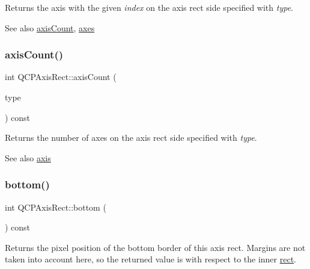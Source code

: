 Returns the axis with the given {\itshape index} on the axis rect side specified with {\itshape type}.

\begin{DoxySeeAlso}{See also}
\hyperlink{class_q_c_p_axis_rect_a85b321acec0f694d8b5fdeafdbff3133}{axis\+Count}, \hyperlink{class_q_c_p_axis_rect_a8db4722cb93e9c4a6f0d91150c200867}{axes} 
\end{DoxySeeAlso}
\hypertarget{class_q_c_p_axis_rect_a85b321acec0f694d8b5fdeafdbff3133}{}\label{class_q_c_p_axis_rect_a85b321acec0f694d8b5fdeafdbff3133} 
\subsubsection{\texorpdfstring{axis\+Count()}{axisCount()}}
{\footnotesize\ttfamily int Q\+C\+P\+Axis\+Rect\+::axis\+Count (\begin{DoxyParamCaption}\item[{\hyperlink{class_q_c_p_axis_ae2bcc1728b382f10f064612b368bc18a}{Q\+C\+P\+Axis\+::\+Axis\+Type}}]{type }\end{DoxyParamCaption}) const}

Returns the number of axes on the axis rect side specified with {\itshape type}.

\begin{DoxySeeAlso}{See also}
\hyperlink{class_q_c_p_axis_rect_a583ae4f6d78b601b732183f6cabecbe1}{axis} 
\end{DoxySeeAlso}
\hypertarget{class_q_c_p_axis_rect_acefdf1abaa8a8ab681e906cc2be9581e}{}\label{class_q_c_p_axis_rect_acefdf1abaa8a8ab681e906cc2be9581e} 
\subsubsection{\texorpdfstring{bottom()}{bottom()}}
{\footnotesize\ttfamily int Q\+C\+P\+Axis\+Rect\+::bottom (\begin{DoxyParamCaption}{ }\end{DoxyParamCaption}) const\hspace{0.3cm}{\ttfamily [inline]}}

Returns the pixel position of the bottom border of this axis rect. Margins are not taken into account here, so the returned value is with respect to the inner \hyperlink{class_q_c_p_layout_element_a208effccfe2cca4a0eaf9393e60f2dd4}{rect}. \hypertarget{class_q_c_p_axis_rect_ab15d4311d6535ccd7af504dc0e2b98c6}{}\label{class_q_c_p_axis_rect_ab15d4311d6535ccd7af504dc0e2b98c6} 
